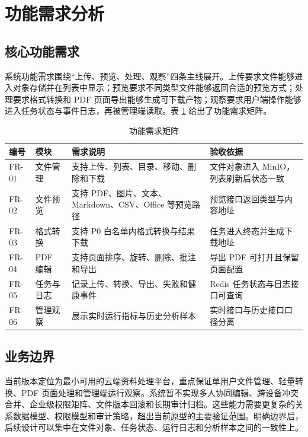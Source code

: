 \section{功能需求分析}

\subsection{核心功能需求}

系统功能需求围绕“上传、预览、处理、观察”四条主线展开。上传要求文件能够进入对象存储并在列表中显示；预览要求不同类型文件能够返回合适的预览方式；处理要求格式转换和 PDF 页面导出能够生成可下载产物；观察要求用户端操作能够进入任务状态与事件日志，再被管理端读取。表 \ref{tab:chap03-functional-requirements} 给出了功能需求矩阵。

\begin{table}[H]
  \centering
  \caption{功能需求矩阵}
  \label{tab:chap03-functional-requirements}
  \begin{tabularx}{\textwidth}{llXX}
    \toprule
    编号 & 模块 & 需求说明 & 验收依据 \\
    \midrule
    FR-01 & 文件管理 & 支持上传、列表、目录、移动、删除和下载 & 文件对象进入 MinIO，列表刷新后状态一致 \\
    FR-02 & 文件预览 & 支持 PDF、图片、文本、Markdown、CSV、Office 等预览路径 & 预览接口返回类型与内容地址 \\
    FR-03 & 格式转换 & 支持 P0 白名单内格式转换与结果下载 & 任务进入终态并生成下载地址 \\
    FR-04 & PDF 编辑 & 支持页面排序、旋转、删除、批注和导出 & 导出 PDF 可打开且保留页面配置 \\
    FR-05 & 任务与日志 & 记录上传、转换、导出、失败和健康事件 & Redis 任务状态与日志接口可查询 \\
    FR-06 & 管理观察 & 展示实时运行指标与历史分析样本 & 实时接口与历史接口口径分离 \\
    \bottomrule
  \end{tabularx}
\end{table}

\subsection{业务边界}

当前版本定位为最小可用的云端资料处理平台，重点保证单用户文件管理、轻量转换、PDF 页面处理和管理端运行观察。系统暂不实现多人协同编辑、跨设备冲突合并、企业级权限矩阵、文件版本回滚和长期审计归档。这些能力需要更复杂的关系数据模型、权限模型和审计策略，超出当前原型的主要验证范围。明确边界后，后续设计可以集中在文件对象、任务状态、运行日志和分析样本之间的一致性上。


